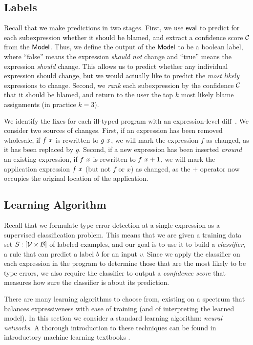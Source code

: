 \subsection{Labels}
\label{sec:labels}
Recall that we make predictions in two stages. First, we use $\mathsf{eval}$ to
predict for each subexpression whether it should be blamed, and extract a
confidence score $\mathcal{C}$ from the $\mathsf{Model}$. Thus, we define the output of the
$\mathsf{Model}$ to be a boolean label, where ``false'' means the expression
\emph{should not} change and ``true'' means the expression \emph{should} change.
This allows us to predict whether any individual expression should change, but
we would actually like to predict the \emph{most likely} expressions to change.
Second, we \emph{rank} each subexpression by the confidence $\mathcal{C}$ that it
should be blamed, and return to the user the top $k$ most likely blame
assignments (in practice $k=3$).


We identify the fixes for each ill-typed program with an expression-level
diff~\citep{Lempsink2009-xf}. We consider two sources of changes. First, if an
expression has been removed wholesale, \eg if $f\ x$ is rewritten to
$g\ x$, we will mark the expression $f$ as changed, as it has been
replaced by $g$. Second, if a new expression has been inserted \emph{around} an
existing expression, \eg if $f\ x$ is rewritten to
$f\ x + 1$, we will mark the application expression $f\ x$
(but not $f$ or $x$) as changed, as the $+$ operator now occupies the original
location of the application.


\subsection{Learning Algorithm}
\label{sec:models}
\lstDeleteShortInline{|} %

Recall that we formulate type error detection at a single expression as a
supervised classification problem. This means that we are given a training data
set
$S : [\mathcal{V} \times \mathcal{B}]$ of labeled examples, and our goal is to use it to
build a \emph{classifier}, \ie a rule that can predict a label $b$ for an input
$v$. Since we apply the classifier on each expression in the program to
determine those that are the most likely to be type errors, we also require the
classifier to output a \emph{confidence score} that measures how sure the
classifier is about its prediction.


There are many learning algorithms to choose from, existing on a spectrum that
balances expressiveness with ease of training (and of interpreting the learned
model). In this section we consider a standard learning algorithm: \emph{neural
networks}. A thorough introduction to these techniques can be found in
introductory machine learning textbooks \citep[\eg][]{Hastie2009-bn}.

